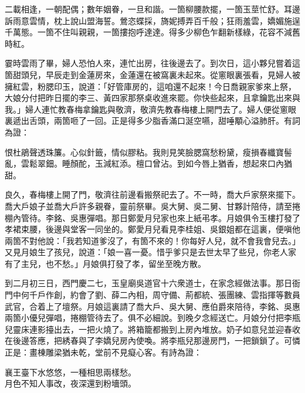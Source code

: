 \begin{myquote}
二載相逢，一朝配偶；數年姻眷，一旦和諧。一箇柳腰款擺，一箇玉莖忙舒。耳邊訴雨意雲情，枕上說山盟海誓。鶯恣蝶採，旖妮搏弄百千般；狂雨羞雲，嬌媚施逞千萬態。一箇不住叫親親，一箇摟抱呼達達。得多少柳色乍翻新樣綠，花容不減舊時紅。
\end{myquote}

霎時雲雨了畢，婦人恐怕人來，連忙出房，往後邊去了。到次日，這小夥兒嘗着這箇甜頭兒，早辰走到金蓮房來，金蓮還在被窩裏未起來。從窻眼裏張看，見婦人被擁紅雲，粉腮印玉，說道：「好管庫房的，這咱還不起來！今日喬親家爹來上祭，大娘分付把昨日擺的李三、黃四家那祭桌收進來罷。你快些起來，且拿鑰匙出來與我。」婦人連忙教春梅拿鑰匙與敬濟，敬濟先教春梅樓上開門去了。婦人便從窻眼裏遞出舌頭，兩箇咂了一回。正是得多少脂香滿口涎空嚥，甜唾顒心溢肺肝。有詞為證：

\begin{myquote}
恨杜鵑聲透珠簾。心似針籤，情似膠粘。我則見笑臉腮窩愁粉黛，瘦損春纖寶髻亂，雲鬆翠鈿。睡顏酡，玉減紅添。檀口曾沾。到如今唇上猶香，想起來口內猶甜。
\end{myquote}

良久，春梅樓上開了門，敬濟往前邊看搬祭祀去了。不一時，喬大戶家祭來擺下。喬大戶娘子並喬大戶許多親眷，靈前祭畢。吳大舅、吳二舅、甘夥計陪侍，請至捲棚內管待。李銘、吳惠彈唱。那日鄭愛月兒家也來上紙弔孝。月娘俱令玉樓打發了孝裙束腰，後邊與堂客一同坐的。鄭愛月兒看見李桂姐、吳銀姐都在這裏，便嗔他兩箇不對他說：「我若知道爹沒了，有箇不來的！你每好人兒，就不會我會兒去。」又見月娘生了孩兒，說道：「娘一喜一憂。惜乎爹只是去世太早了些兒，你老人家有了主兒，也不愁。」月娘俱打發了孝，留坐至晚方散。

到二月初三日，西門慶二七，玉皇廟吳道官十六衆道士，在家念經做法事。那日衙門中何千戶作創，約會了劉、薛二內相，周守備、荊都統、張團練、雲指揮等數員武官，合着上了壇祭。月娘這裏請了喬大戶、吳大舅、應伯爵來陪待，李銘、吳惠兩箇小優兒彈唱，捲棚管待去了。俱不必細說。到晚夕念經送亡。月娘分付把李瓶兒靈床連影擡出去，一把火燒了。將箱籠都搬到上房內堆放。奶子如意兒並迎春收在後邊答應，把綉春與了李嬌兒房內使喚。將李瓶兒那邊房門，一把鎖鎖了。可憐正是：畫棟雕梁猶未乾，堂前不見癡心客。有詩為證：

\begin{myquote}
襄王臺下水悠悠，一種相思兩樣愁。\\月色不知人事改，夜深還到粉墻頭。
\end{myquote}


